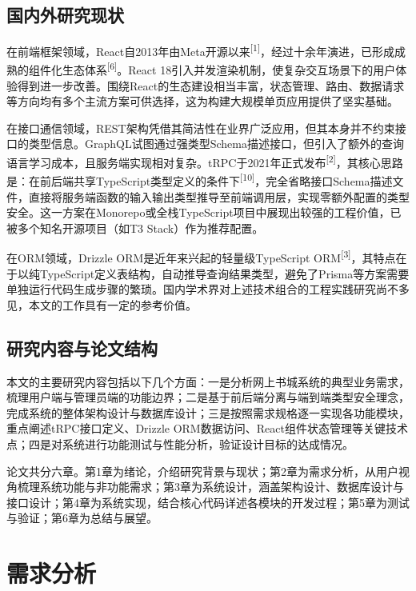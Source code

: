\documentclass[12pt,a4paper]{ctexart}
\begin{document}
\subsection{国内外研究现状}

在前端框架领域，React自2013年由Meta开源以来\textsuperscript{[1]}，经过十余年演进，已形成成熟的组件化生态体系\textsuperscript{[6]}。React 18引入并发渲染机制，使复杂交互场景下的用户体验得到进一步改善。围绕React的生态建设相当丰富，状态管理、路由、数据请求等方向均有多个主流方案可供选择，这为构建大规模单页应用提供了坚实基础。

在接口通信领域，REST架构凭借其简洁性在业界广泛应用，但其本身并不约束接口的类型信息。GraphQL试图通过强类型Schema描述接口，但引入了额外的查询语言学习成本，且服务端实现相对复杂。tRPC于2021年正式发布\textsuperscript{[2]}，其核心思路是：在前后端共享TypeScript类型定义的条件下\textsuperscript{[10]}，完全省略接口Schema描述文件，直接将服务端函数的输入输出类型推导至前端调用层，实现零额外配置的类型安全。这一方案在Monorepo或全栈TypeScript项目中展现出较强的工程价值，已被多个知名开源项目（如T3 Stack）作为推荐配置。

在ORM领域，Drizzle ORM是近年来兴起的轻量级TypeScript ORM\textsuperscript{[3]}，其特点在于以纯TypeScript定义表结构，自动推导查询结果类型，避免了Prisma等方案需要单独运行代码生成步骤的繁琐。国内学术界对上述技术组合的工程实践研究尚不多见，本文的工作具有一定的参考价值。

\subsection{研究内容与论文结构}

本文的主要研究内容包括以下几个方面：一是分析网上书城系统的典型业务需求，梳理用户端与管理员端的功能边界；二是基于前后端分离与端到端类型安全理念，完成系统的整体架构设计与数据库设计；三是按照需求规格逐一实现各功能模块，重点阐述tRPC接口定义、Drizzle ORM数据访问、React组件状态管理等关键技术点；四是对系统进行功能测试与性能分析，验证设计目标的达成情况。

论文共分六章。第1章为绪论，介绍研究背景与现状；第2章为需求分析，从用户视角梳理系统功能与非功能需求；第3章为系统设计，涵盖架构设计、数据库设计与接口设计；第4章为系统实现，结合核心代码详述各模块的开发过程；第5章为测试与验证；第6章为总结与展望。

\newpage

\section{需求分析}
\end{document}
